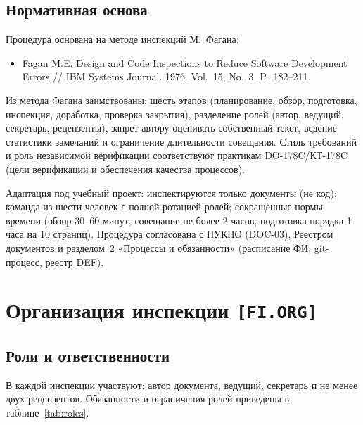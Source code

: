 \documentclass[12pt,a4paper]{article}
\begin{document}
\subsection{Нормативная основа}

Процедура основана на методе инспекций М.~Фагана:
\begin{itemize}
  \item Fagan M.E. Design and Code Inspections to Reduce Software Development
        Errors // IBM Systems Journal. 1976. Vol.~15, No.~3. P.~182--211.
\end{itemize}

Из метода Фагана заимствованы: шесть этапов (планирование, обзор, подготовка,
инспекция, доработка, проверка закрытия), разделение ролей (автор, ведущий,
секретарь, рецензенты), запрет автору оценивать собственный текст, ведение
статистики замечаний и ограничение длительности совещания. Стиль требований и
роль независимой верификации соответствуют практикам DO-178C/КТ-178C
(цели верификации и обеспечения качества процессов).

Адаптация под учебный проект: инспектируются только документы (не код);
команда из шести человек с полной ротацией ролей; сокращённые нормы времени
(обзор 30--60 минут, совещание не более 2 часов, подготовка порядка 1 часа на
10 страниц). Процедура согласована с ПУКПО (DOC-03), Реестром документов и
разделом~2 «Процессы и обязанности» (расписание ФИ, git-процесс, реестр DEF).

\section{Организация инспекции \texttt{[FI.ORG]}}

\subsection{Роли и ответственности}

В каждой инспекции участвуют: автор документа, ведущий, секретарь и не менее
двух рецензентов. Обязанности и ограничения ролей приведены в
таблице~\ref{tab:roles}.
\end{document}
